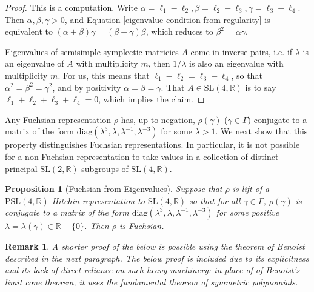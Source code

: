 \documentclass[12pt,a4paper]{amsart}
\newcommand{\bbR}{\mathbb R}
\theoremstyle{definition}
\theoremstyle{plain}
\newtheorem{proposition}[theorem]{Proposition}
\newtheorem*{remark}{Remark}
\numberwithin{equation}{section}
\begin{document}
\begin{proof}
    This is a computation. Write $\alpha = \ell_1 - \ell_2, \beta = \ell_2 - \ell_3, \gamma = \ell_3 - \ell_4$. Then $\alpha, \beta, \gamma > 0$, and Equation \ref{eigenvalue-condition-from-regularity} is equivalent to $(\alpha + \beta)\gamma = (\beta + \gamma)\beta$, which reduces to $\beta^2 = \alpha \gamma$.
    
    Eigenvalues of semisimple symplectic matricies $A$ come in inverse pairs, i.e. if $\lambda$ is an eigenvalue of $A$ with multiplicity $m$, then $1/\lambda$ is also an eigenvalue with multiplicity $m$. For us, this means that $\ell_1 - \ell_2 = \ell_3 - \ell_4$, so that $\alpha^2 = \beta^2 = \gamma^2$, and by positivity $\alpha = \beta = \gamma$. That $A \in \text{SL}(4, \mathbb{R})$ is to say $\ell_1 + \ell_2 + \ell_3 + \ell_4 = 0$, which implies the claim.
\end{proof}

Any Fuchsian representation $\rho$ has, up to negation, $\rho(\gamma)$ ($\gamma \in \Gamma)$ conjugate to a matrix of the form $\text{diag}(\lambda^3, \lambda, \lambda^{-1}, \lambda^{-3})$ for some $\lambda > 1$. We next show that this property distinguishes Fuchsian representations. In particular, it is not possible for a non-Fuchsian representation to take values in a collection of distinct principal $\text{SL}(2, \mathbb{R})$ subgroups of $\text{SL}(4, \mathbb{R})$.

\begin{proposition}[Fuchsian from Eigenvalues]\label{eigenvalues-that-look-fuchsian-implies-fuchsian}
    Suppose that $\rho$ is lift of a {\rm{$\text{PSL}(4,\bbR)$}} Hitchin representation to {\rm{$\text{SL}(4,\bbR)$}} so that for all $\gamma \in \Gamma$, $\rho(\gamma)$ is conjugate to a matrix of the form $\text{diag}(\lambda^3, \lambda, \lambda^{-1}, \lambda^{-3})$ for some positive $\lambda = \lambda(\gamma) \in \mathbb{R} - \{0\}$. Then $\rho$ is Fuchsian.
\end{proposition}

\begin{remark}
A shorter proof of the below is possible using the theorem of Benoist described in the next paragraph. The below proof is included due to its explicitness and its lack of direct reliance on such heavy machinery: in place of of Benoist's limit cone theorem, it uses the fundamental theorem of symmetric polynomials.
\end{remark}
\end{document}
